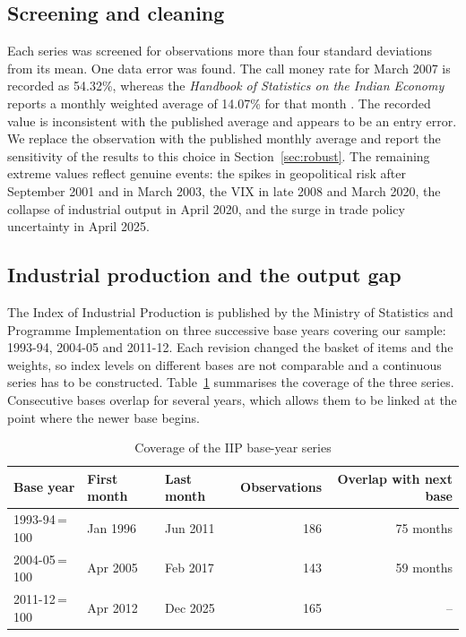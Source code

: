 \documentclass[10pt,twocolumn,a4paper]{article}
\begin{document}
\subsection{Screening and cleaning}\label{sec:clean}

Each series was screened for observations more than four standard deviations from its mean. One data error was found. The call money rate for March 2007 is recorded as 54.32\%, whereas the \textit{Handbook of Statistics on the Indian Economy} reports a monthly weighted average of 14.07\% for that month \citep{rbi2009}. The recorded value is inconsistent with the published average and appears to be an entry error. We replace the observation with the published monthly average and report the sensitivity of the results to this choice in Section~\ref{sec:robust}. The remaining extreme values reflect genuine events: the spikes in geopolitical risk after September 2001 and in March 2003, the VIX in late 2008 and March 2020, the collapse of industrial output in April 2020, and the surge in trade policy uncertainty in April 2025.

\subsection{Industrial production and the output gap}\label{sec:iip}

The Index of Industrial Production is published by the Ministry of Statistics and Programme Implementation on three successive base years covering our sample: 1993-94, 2004-05 and 2011-12. Each revision changed the basket of items and the weights, so index levels on different bases are not comparable and a continuous series has to be constructed. Table~\ref{tab:iipcover} summarises the coverage of the three series. Consecutive bases overlap for several years, which allows them to be linked at the point where the newer base begins.

\begin{table}[!t]\centering\small
\caption{Coverage of the IIP base-year series}\label{tab:iipcover}
\begin{tabular}{lllrr}
\toprule
Base year & First month & Last month & Observations & Overlap with next base \\
\midrule
1993-94\,=\,100 & Jan 1996 & Jun 2011 & 186 & 75 months \\
2004-05\,=\,100 & Apr 2005 & Feb 2017 & 143 & 59 months \\
2011-12\,=\,100 & Apr 2012 & Dec 2025 & 165 & -- \\
\bottomrule
\end{tabular}
\end{table}
\end{document}
